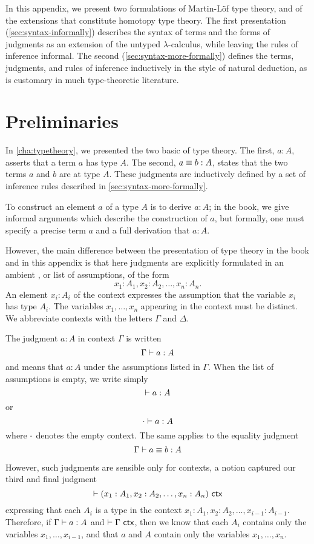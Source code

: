 In this appendix, we present two formulations of Martin-L\"{o}f type
theory, and of the extensions that constitute homotopy type theory.
The first presentation (\autoref{sec:syntax-informally}) describes the syntax of
terms and the forms of judgments as an extension of the untyped
$\lambda$-calculus, while leaving the rules of inference informal.
The second (\autoref{sec:syntax-more-formally}) defines the terms, judgments,
and rules of inference inductively in the style of natural deduction, as
is customary in much type-theoretic literature.

\section*{Preliminaries}
\label{sec:formal-prelim}


In \autoref{cha:typetheory}, we presented the two basic 
of type theory. The first, $a:A$, asserts that a term $a$ has type $A$. The second,
$a\equiv b:A$, states that the two terms $a$ and $b$ are 
at type $A$. These judgments are inductively defined by a set of
inference rules described in \autoref{sec:syntax-more-formally}.

To construct an element $a$ of a type $A$ is to derive $a:A$; in the book, we
give informal arguments which describe the construction of $a$, but formally,
one must specify a precise term $a$ and a full derivation that $a:A$.

However, the main difference between the presentation of type theory in the book
and in this appendix is that here judgments are explicitly
formulated in an ambient ,
or list of assumptions, of the form
\[
  x_1:A_1, x_2:A_2,\dots,x_n:A_n.
\]
An element $x_i : A_i$ of the context expresses the assumption that the
variable
%
$x_i$ has type $A_i$. The variables $x_1, \ldots, x_n$ appearing in
the context must be distinct. We abbreviate contexts with the letters $\Gamma$
and $\Delta$.

The judgment $a:A$ in context $\Gamma$ is written 
\[ \Gamma \vdash a : A \]
and means that $a:A$ under the assumptions listed in $\Gamma$. When the list of
assumptions is empty, we write simply
\[ \vdash a : A \]
or
\[ \cdot \vdash a : A \]
where $\cdot$ denotes the empty context. The same applies to the equality
judgment
\[
  \Gamma \vdash a \equiv b : A
\]

However, such judgments are sensible only for  contexts,
%
a notion captured our third and final judgment
\[
  \vdash (x_1:A_1, x_2:A_2,\dots,x_n:A_n)\ \mathsf{ctx}
\]
expressing that each $A_i$ is a type in the context $x_1:A_1,
x_2:A_2,\dots,x_{i-1}:A_{i-1}$. Therefore, if $\Gamma \vdash a : A$ and
$\vdash \Gamma\ \mathsf{ctx}$, then we know that each $A_i$ contains only the variables
$x_1,\dots,x_{i-1}$, and that $a$ and $A$ contain only the variables
$x_1,\dots,x_n$.

